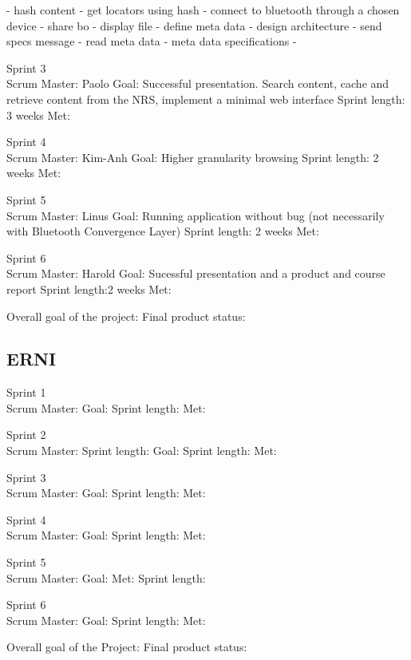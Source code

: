 
- hash content
- get locators using hash
- connect to bluetooth through a chosen device
- share bo
- display file
- define meta data
- design architecture
- send specs message
- read meta data
- meta data specifications
- 


Sprint 3\\
Scrum Master: Paolo
Goal: Successful presentation. Search content, cache and retrieve content from the NRS, implement a minimal web interface
Sprint length: 3 weeks
Met:

Sprint 4\\
Scrum Master: Kim-Anh
Goal: Higher granularity browsing
Sprint length: 2 weeks
Met:

Sprint 5\\
Scrum Master: Linus
Goal: Running application without bug (not necessarily with Bluetooth Convergence Layer)
Sprint length: 2 weeks
Met:

Sprint 6\\
Scrum Master: Harold
Goal: Sucessful presentation and a product and course report
Sprint length:2 weeks
Met:

Overall goal of the project:
Final product status:

\subsection {ERNI}

Sprint 1\\
Scrum Master:
Goal: 
Sprint length:
Met:

Sprint 2\\
Scrum Master:
Sprint length:
Goal: 
Sprint length:
Met:

Sprint 3\\
Scrum Master:
Goal: 
Sprint length:
Met:

Sprint 4\\
Scrum Master:
Goal: 
Sprint length:
Met:

Sprint 5\\
Scrum Master:
Goal: 
Met:
Sprint length:

Sprint 6\\
Scrum Master:
Goal: 
Sprint length:
Met:


Overall goal of the Project:
Final product status: